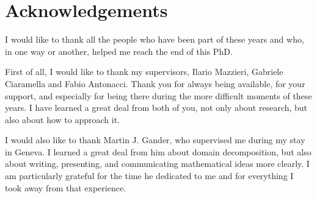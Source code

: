 \documentclass{Configuration_Files/PoliMi3i_thesis}
\begin{document}

\listoffigures

\listoftables

\chapter*{Acknowledgements}
I would like to thank all the people who have been part of these years and who, in one way or another, helped me reach the end of this PhD.

First of all, I would like to thank my supervisors, Ilario Mazzieri, Gabriele Ciaramella and Fabio Antonacci. Thank you for always being available, for your support, and especially for being there during the more difficult moments of these years. I have learned a great deal from both of you, not only about research, but also about how to approach it.

I would also like to thank Martin J. Gander, who supervised me during my stay in Geneva. I learned a great deal from him about domain decomposition, but also about writing, presenting, and communicating mathematical ideas more clearly. I am particularly grateful for the time he dedicated to me and for everything I took away from that experience.
\end{document}
